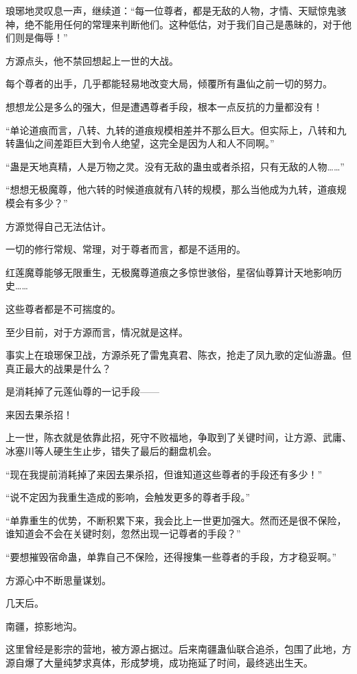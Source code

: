 
\begin{this_body}

琅琊地灵叹息一声，继续道：“每一位尊者，都是无敌的人物，才情、天赋惊鬼骇神，绝不能用任何的常理来判断他们。这种低估，对于我们自己是愚昧的，对于他们则是侮辱！”

方源点头，他不禁回想起上一世的大战。

每个尊者的出手，几乎都能轻易地改变大局，倾覆所有蛊仙之前一切的努力。

想想龙公是多么的强大，但是遭遇尊者手段，根本一点反抗的力量都没有！

“单论道痕而言，八转、九转的道痕规模相差并不那么巨大。但实际上，八转和九转蛊仙之间差距巨大到令人绝望，这完全是因为人和人不同啊。”

“蛊是天地真精，人是万物之灵。没有无敌的蛊虫或者杀招，只有无敌的人物……”

“想想无极魔尊，他六转的时候道痕就有八转的规模，那么当他成为九转，道痕规模会有多少？”

方源觉得自己无法估计。

一切的修行常规、常理，对于尊者而言，都是不适用的。

红莲魔尊能够无限重生，无极魔尊道痕之多惊世骇俗，星宿仙尊算计天地影响历史……

这些尊者都是不可揣度的。

至少目前，对于方源而言，情况就是这样。

事实上在琅琊保卫战，方源杀死了雷鬼真君、陈衣，抢走了凤九歌的定仙游蛊。但真正最大的战果是什么？

是消耗掉了元莲仙尊的一记手段——

来因去果杀招！

上一世，陈衣就是依靠此招，死守不败福地，争取到了关键时间，让方源、武庸、冰塞川等人硬生生止步，错失了最后的翻盘机会。

“现在我提前消耗掉了来因去果杀招，但谁知道这些尊者的手段还有多少！”

“说不定因为我重生造成的影响，会触发更多的尊者手段。”

“单靠重生的优势，不断积累下来，我会比上一世更加强大。然而还是很不保险，谁知道会不会在关键时刻，忽然出现一记尊者的手段？”

“要想摧毁宿命蛊，单靠自己不保险，还得搜集一些尊者的手段，方才稳妥啊。”

方源心中不断思量谋划。

几天后。

南疆，掠影地沟。

这里曾经是影宗的营地，被方源占据过。后来南疆蛊仙联合追杀，包围了此地，方源自爆了大量纯梦求真体，形成梦境，成功拖延了时间，最终逃出生天。


\end{this_body}
